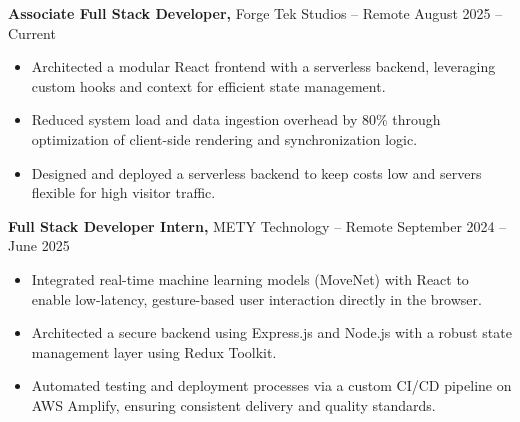 \documentclass[11pt]{article}       %
\begin{document}
\textbf{Associate Full Stack Developer,} {Forge Tek Studios} -- Remote \hfill August 2025 -- Current 
\vspace{-9pt}
\begin{itemize}
  \item Architected a modular React frontend with a serverless backend, leveraging custom hooks and context for efficient state management.
  \item Reduced system load and data ingestion overhead by 80\% through optimization of client-side rendering and synchronization logic.
  \item Designed and deployed a serverless backend to keep costs low and servers flexible for high visitor traffic.
\end{itemize}

\textbf{Full Stack Developer Intern,} {METY Technology} -- Remote \hfill September 2024 -- June 2025 
\vspace{-9pt}
\begin{itemize}
  \item Integrated real-time machine learning models (MoveNet) with React to enable low-latency, gesture-based user interaction directly in the browser.
  \item Architected a secure backend using Express.js and Node.js with a robust state management layer using Redux Toolkit.
  \item Automated testing and deployment processes via a custom CI/CD pipeline on AWS Amplify, ensuring consistent delivery and quality standards.
\end{itemize}

\end{document}
